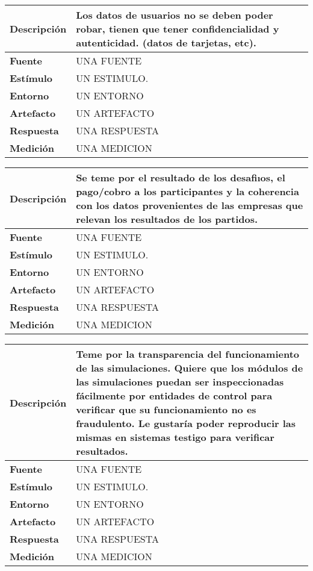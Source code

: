 \begin{center}
  \begin{tabular}{| l | p{10cm} | }
    \hline
  \textbf{Descripción} & Los datos de usuarios no se deben poder robar, tienen que tener confidencialidad y autenticidad. (datos de tarjetas, etc). \\  \hline
  \textbf{Fuente} & UNA FUENTE\\  \hline
  \textbf{Estímulo} & UN ESTIMULO.\\  \hline
  \textbf{Entorno} & UN ENTORNO\\  \hline
  \textbf{Artefacto} & UN ARTEFACTO\\  \hline
  \textbf{Respuesta} & UNA RESPUESTA\\  \hline
  \textbf{Medición} & UNA MEDICION\\  \hline
  \end{tabular}
\end{center} 

\begin{center}
  \begin{tabular}{| l | p{10cm} | }
    \hline
  \textbf{Descripción} & Se teme por el resultado de los desafiıos, el pago/cobro a los participantes y la coherencia con los datos provenientes de las empresas que relevan los resultados de los partidos. \\  \hline
  \textbf{Fuente} & UNA FUENTE\\  \hline
  \textbf{Estímulo} & UN ESTIMULO.\\  \hline
  \textbf{Entorno} & UN ENTORNO\\  \hline
  \textbf{Artefacto} & UN ARTEFACTO\\  \hline
  \textbf{Respuesta} & UNA RESPUESTA\\  \hline
  \textbf{Medición} & UNA MEDICION\\  \hline
  \end{tabular}
\end{center} 

\begin{center}
  \begin{tabular}{| l | p{10cm} | }
    \hline
  \textbf{Descripción} & Teme por la transparencia del funcionamiento de las simulaciones. Quiere que los módulos de las simulaciones puedan ser inspeccionadas fácilmente por entidades de control para verificar que su funcionamiento no es fraudulento. Le gustaría poder reproducir las mismas en sistemas testigo para verificar resultados.\\  \hline
  \textbf{Fuente} & UNA FUENTE\\  \hline
  \textbf{Estímulo} & UN ESTIMULO.\\  \hline
  \textbf{Entorno} & UN ENTORNO\\  \hline
  \textbf{Artefacto} & UN ARTEFACTO\\  \hline
  \textbf{Respuesta} & UNA RESPUESTA\\  \hline
  \textbf{Medición} & UNA MEDICION\\  \hline
  \end{tabular}
\end{center} 


